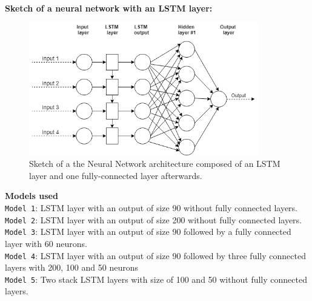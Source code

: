 \textbf{Sketch of a neural network with an LSTM layer:}
\begin{figure}[h]
    \centering
    \includegraphics[width=10cm]{images/nn-sketch-lstm.png}
    \caption[Sketch of a Neural Network with LSTM layer]{Sketch of a the Neural Network architecture composed of an LSTM layer and one fully-connected layer afterwards.}
    \label{fig-annex:nn-sketch-lstm}
\end{figure}

\noindent\textbf{Models used}\\
\texttt{Model 1}: LSTM layer with an output of size 90 without  fully connected layers. \\
\texttt{Model 2}: LSTM layer with an output of size 200 without fully connected layers. \\
\texttt{Model 3}: LSTM layer with an output of size 90 followed by a fully connected layer with 60 neurons. \\
\texttt{Model 4}: LSTM layer with an output of size 90 followed by three fully connected layers with 200, 100 and 50 neurons \\
\texttt{Model 5}: Two stack LSTM layers with size of 100 and 50 without fully connected layers. \\


